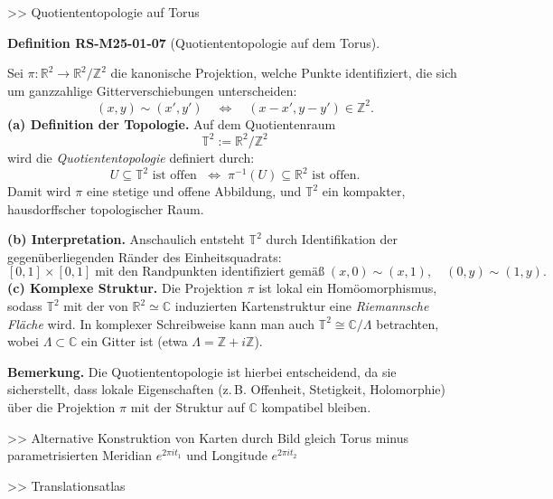 \documentclass[10pt, letterpaper]{article}
\newcommand{\CustomHeading}[3]{%
  \par\medskip\noindent%
  \textbf{#1 #2} \textnormal{(#3)}.\enskip%
}
\newenvironment{DEF}[2]{\begin{unitbox}\CustomHeading{Definition}{#1}{#2}}{\end{unitbox}}
\begin{document}
>> Quotiententopologie auf Torus


\begin{DEF}{RS-M25-01-07}{Quotiententopologie auf dem Torus}
Sei $\pi : \mathbb{R}^2 \to \mathbb{R}^2 / \mathbb{Z}^2$ die kanonische Projektion, welche Punkte identifiziert, die sich um ganzzahlige Gitterverschiebungen unterscheiden:
\[
(x, y) \sim (x', y') \quad \Longleftrightarrow \quad (x - x', y - y') \in \mathbb{Z}^2 .
\]
\textbf{(a) Definition der Topologie.}  
Auf dem Quotientenraum
\[
\mathbb{T}^2 := \mathbb{R}^2 / \mathbb{Z}^2
\]
wird die \emph{Quotiententopologie} definiert durch:
\[
U \subseteq \mathbb{T}^2 \text{ ist offen } \; \Longleftrightarrow \; 
\pi^{-1}(U) \subseteq \mathbb{R}^2 \text{ ist offen.}
\]
Damit wird $\pi$ eine stetige und offene Abbildung, und $\mathbb{T}^2$ ein kompakter, hausdorffscher topologischer Raum.

\textbf{(b) Interpretation.}  
Anschaulich entsteht $\mathbb{T}^2$ durch Identifikation der gegenüberliegenden Ränder des Einheitsquadrats:
\[
[0,1] \times [0,1] \; \text{mit den Randpunkten identifiziert gemäß} \;
(x,0) \sim (x,1), \quad (0,y) \sim (1,y).
\]
\textbf{(c) Komplexe Struktur.}  
Die Projektion $\pi$ ist lokal ein Homöomorphismus, sodass $\mathbb{T}^2$ mit der von $\mathbb{R}^2 \simeq \mathbb{C}$ induzierten Kartenstruktur eine \emph{Riemannsche Fläche} wird.  
In komplexer Schreibweise kann man auch $\mathbb{T}^2 \cong \mathbb{C}/\Lambda$ betrachten, wobei $\Lambda \subset \mathbb{C}$ ein Gitter ist (etwa $\Lambda = \mathbb{Z} + i \mathbb{Z}$).

\textbf{Bemerkung.}  
Die Quotiententopologie ist hierbei entscheidend, da sie sicherstellt, dass lokale Eigenschaften (z.\,B. Offenheit, Stetigkeit, Holomorphie) über die Projektion $\pi$ mit der Struktur auf $\mathbb{C}$ kompatibel bleiben.
\end{DEF}



>> Alternative Konstruktion von Karten durch Bild gleich Torus minus parametrisierten Meridian $e^{2\pi it_1}$ und Longitude $e^{2\pi it_2}$


>> Translationsatlas
\end{document}
